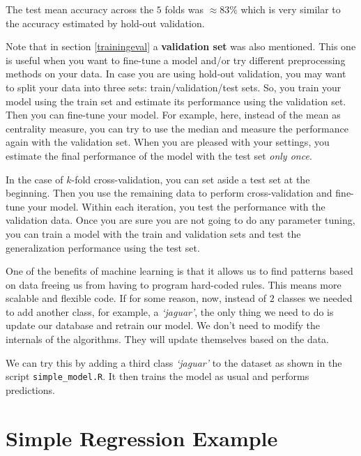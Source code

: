 \documentclass[
  11pt,
]{krantz}
\makeatletter
\newenvironment{kframe}{%
\medskip{}
\setlength{\fboxsep}{.8em}
 \def\at@end@of@kframe{}%
 \ifinner\ifhmode%
  \def\at@end@of@kframe{\end{minipage}}%
  \begin{minipage}{\columnwidth}%
 \fi\fi%
 \def\FrameCommand##1{\hskip\@totalleftmargin \hskip-\fboxsep
 \colorbox{shadecolor}{##1}\hskip-\fboxsep
     \hskip-\linewidth \hskip-\@totalleftmargin \hskip\columnwidth}%
 \MakeFramed {\advance\hsize-\width
   \@totalleftmargin\z@ \linewidth\hsize
   \@setminipage}}%
 {\par\unskip\endMakeFramed%
 \at@end@of@kframe}
\newenvironment{rmdblock}[1]
  {
  \begin{itemize}
  \renewcommand{\labelitemi}{
    \raisebox{-.7\height}[0pt][0pt]{
      {\setkeys{Gin}{width=3em,keepaspectratio}\texttt{[image: images/icons/\#1]}}
    }
  }
  \setlength{\fboxsep}{1em}
  \begin{kframe}
  \item
  }
  {
  \end{kframe}
  \end{itemize}
  }
\newenvironment{rmdinfo}
  {\begin{rmdblock}{info}}
  {\end{rmdblock}}
\newenvironment{rmdgoodpractice}
  {\begin{rmdblock}{goodpractice}}
  {\end{rmdblock}}
\makeatother
\begin{document}
The test mean accuracy across the \(5\) folds was \(\approx 83\%\) which is very similar to the accuracy estimated by hold-out validation.

\begin{rmdgoodpractice}
Note that in section \ref{trainingeval} a \textbf{validation set} was also mentioned. This one is useful when you want to fine-tune a model and/or try different preprocessing methods on your data. In case you are using hold-out validation, you may want to split your data into three sets: train/validation/test sets. So, you train your model using the train set and estimate its performance using the validation set. Then you can fine-tune your model. For example, here, instead of the mean as centrality measure, you can try to use the median and measure the performance again with the validation set. When you are pleased with your settings, you estimate the final performance of the model with the test set \emph{only once}.

In the case of \(k\)-fold cross-validation, you can set aside a test set at the beginning. Then you use the remaining data to perform cross-validation and fine-tune your model. Within each iteration, you test the performance with the validation data. Once you are sure you are not going to do any parameter tuning, you can train a model with the train and validation sets and test the generalization performance using the test set.
\end{rmdgoodpractice}

\begin{rmdinfo}
One of the benefits of machine learning is that it allows us to find patterns based on data freeing us from having to program hard-coded rules. This means more scalable and flexible code. If for some reason, now, instead of \(2\) classes we needed to add another class, for example, a \emph{`jaguar'}, the only thing we need to do is update our database and retrain our model. We don't need to modify the internals of the algorithms. They will update themselves based on the data.

We can try this by adding a third class \emph{`jaguar'} to the dataset as shown in the script \texttt{simple\_model.R}. It then trains the model as usual and performs predictions.
\end{rmdinfo}

\hypertarget{simple-regression-example}{%
\section{Simple Regression Example}\label{simple-regression-example}}
\end{document}
